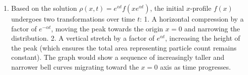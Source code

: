 \documentclass{article}
\begin{document}
\begin{enumerate}[label=\fbox{\arabic*}]
\begin{enumerate}[label=(\arabic*)]
                Notice that $\frac{\partial x}{\partial \tau} = -\alpha \xi e^{-\alpha \tau} = -\alpha x = u$.
                So $\frac{\partial \tilde{\rho}}{\partial \tau} = u \frac{\partial \rho}{\partial x} + \frac{\partial \rho}{\partial t}$.
                From the continuity equation, $\frac{\partial \rho}{\partial t} + u \frac{\partial \rho}{\partial x} + \rho \frac{\partial u}{\partial x} = 0$.
                Since $u = -\alpha x$, we have $\frac{\partial u}{\partial x} = -\alpha$. Substituting this in, we get $\frac{\partial \rho}{\partial t} + u \frac{\partial \rho}{\partial x} - \alpha \rho = 0$.
                Thus, $\frac{\partial \tilde{\rho}}{\partial \tau} = \alpha \tilde{\rho}$.
                Solving this ODE yields $\tilde{\rho}(\xi, \tau) = \tilde{\rho}(\xi, 0) e^{\alpha \tau}$.
                Since $x = \xi$ when $\tau = 0$, we have $\tilde{\rho}(\xi, 0) = \rho(\xi, 0) = f(\xi)$.
                Returning to the original variables $\tau = t$ and $\xi = x e^{\alpha t}$, the distribution at time $t$ is:
                \[
                  \rho(x, t) = f(x e^{\alpha t}) e^{\alpha t}.
                \]
          \item Based on the solution $\rho(x, t) = e^{\alpha t} f(x e^{\alpha t})$, the initial $x$-profile $f(x)$ undergoes two transformations over time $t$:
                1. A horizontal compression by a factor of $e^{-\alpha t}$, moving the peak towards the origin $x=0$ and narrowing the distribution.
                2. A vertical stretch by a factor of $e^{\alpha t}$, increasing the height of the peak (which ensures the total area representing particle count remains constant).
                The graph would show a sequence of increasingly taller and narrower bell curves migrating toward the $x=0$ axis as time progresses.
        \end{enumerate}


\end{enumerate}
\end{document}
